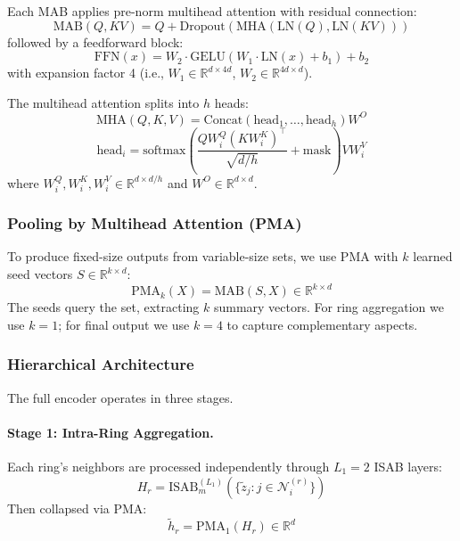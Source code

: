 Each MAB applies pre-norm multihead attention with residual connection:
\begin{equation}
    \text{MAB}(Q, KV) = Q + \text{Dropout}(\text{MHA}(\text{LN}(Q), \text{LN}(KV)))
\end{equation}
followed by a feedforward block:
\begin{equation}
    \text{FFN}(x) = W_2 \cdot \text{GELU}(W_1 \cdot \text{LN}(x) + b_1) + b_2
\end{equation}
with expansion factor 4 (i.e., $W_1 \in \mathbb{R}^{d \times 4d}$, $W_2 \in \mathbb{R}^{4d \times d}$).

The multihead attention splits into $h$ heads:
\begin{equation}
    \text{MHA}(Q, K, V) = \text{Concat}(\text{head}_1, \ldots, \text{head}_h) W^O
\end{equation}
\begin{equation}
    \text{head}_i = \text{softmax}\left(\frac{Q W_i^Q (K W_i^K)^\top}{\sqrt{d/h}} + \text{mask}\right) V W_i^V
\end{equation}
where $W_i^Q, W_i^K, W_i^V \in \mathbb{R}^{d \times d/h}$ and $W^O \in \mathbb{R}^{d \times d}$.

\subsubsection{Pooling by Multihead Attention (PMA)}

To produce fixed-size outputs from variable-size sets, we use PMA with $k$ learned seed vectors $S \in \mathbb{R}^{k \times d}$:
\begin{equation}
    \text{PMA}_k(X) = \text{MAB}(S, X) \in \mathbb{R}^{k \times d}
\end{equation}
The seeds query the set, extracting $k$ summary vectors. For ring aggregation we use $k=1$; for final output we use $k=4$ to capture complementary aspects.

\subsubsection{Hierarchical Architecture}

The full encoder operates in three stages.

\paragraph{Stage 1: Intra-Ring Aggregation.} Each ring's neighbors are processed independently through $L_1 = 2$ ISAB layers:
\begin{equation}
    H_r = \text{ISAB}_m^{(L_1)}(\{\tilde{z}_j : j \in \mathcal{N}_i^{(r)}\})
\end{equation}
Then collapsed via PMA:
\begin{equation}
    \tilde{h}_r = \text{PMA}_1(H_r) \in \mathbb{R}^d
\end{equation}

